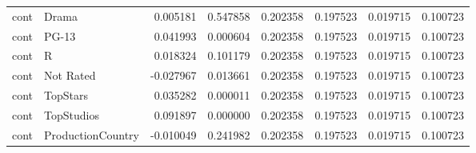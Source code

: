 \begin{tabular}{llrrrrrr}
cont & Drama & 0.005181 & 0.547858 & 0.202358 & 0.197523 & 0.019715 & 0.100723 \\
cont & PG-13 & 0.041993 & 0.000604 & 0.202358 & 0.197523 & 0.019715 & 0.100723 \\
cont & R & 0.018324 & 0.101179 & 0.202358 & 0.197523 & 0.019715 & 0.100723 \\
cont & Not Rated & -0.027967 & 0.013661 & 0.202358 & 0.197523 & 0.019715 & 0.100723 \\
cont & TopStars & 0.035282 & 0.000011 & 0.202358 & 0.197523 & 0.019715 & 0.100723 \\
cont & TopStudios & 0.091897 & 0.000000 & 0.202358 & 0.197523 & 0.019715 & 0.100723 \\
cont & ProductionCountry & -0.010049 & 0.241982 & 0.202358 & 0.197523 & 0.019715 & 0.100723 \\
\bottomrule
\end{tabular}
